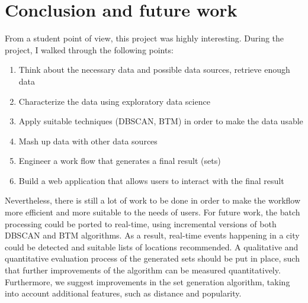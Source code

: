 \section{Conclusion and future work}

From a student point of view, this project was highly interesting. During the project, I walked through the following points:
\begin{enumerate}
  \item Think about the necessary data and possible data sources, retrieve enough data
  \item Characterize the data using exploratory data science
  \item Apply suitable techniques (DBSCAN, BTM) in order to make the data usable
  \item Mash up data with other data sources
  \item Engineer a work flow that generates a final result (sets)
  \item Build a web application that allows users to interact with the final result 
\end{enumerate}
Nevertheless, there is still a lot of work to be done in order to make the workflow more efficient and more suitable to the needs of users. For future work, the batch processing could be ported to real-time, using incremental versions of both DBSCAN and BTM algorithms. As a result, real-time events happening in a city could be detected and suitable lists of locations recommended. A qualitative and quantitative evaluation process of the generated sets should be put in place, such that further improvements of the algorithm can be measured quantitatively. Furthermore, we suggest improvements in the set generation algorithm, taking into account additional features, such as distance and popularity.

\newpage
\nocite{*} 


 


